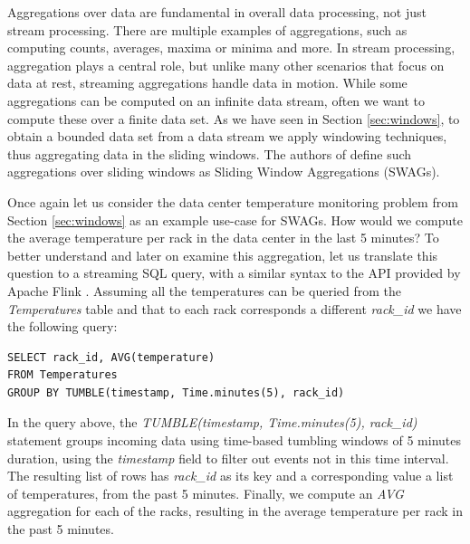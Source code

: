 Aggregations over data are fundamental in overall data processing, not just stream processing. There are multiple examples of aggregations, such as computing counts, averages, maxima or minima and more. In stream processing, aggregation plays a central role, but unlike many other scenarios that focus on data at rest, streaming aggregations handle data in motion. While some aggregations can be computed on an infinite data stream, often we want to compute these over a finite data set. As we have seen in Section \ref{sec:windows}, to obtain a bounded data set from a data stream we apply windowing techniques, thus aggregating data in the sliding windows. The authors of \cite{Tangwongsan-Sliding-Window-Aggregation-Algorithms} define such aggregations over sliding windows as Sliding Window Aggregations (SWAGs). 

Once again let us consider the data center temperature monitoring problem from Section \ref{sec:windows} as an example use-case for SWAGs. How would we compute the average temperature per rack in the data center in the last 5 minutes? To better understand and later on examine this aggregation, let us translate this question to a streaming SQL query, with a similar syntax to the API provided by Apache Flink \cite{flink}. Assuming all the temperatures can be queried from the \textit{Temperatures} table and that to each rack corresponds a different \textit{rack\_id} we have the following query:

\begin{verbatim}
SELECT rack_id, AVG(temperature)
FROM Temperatures
GROUP BY TUMBLE(timestamp, Time.minutes(5), rack_id)
\end{verbatim}

In the query above, the \textit{TUMBLE(timestamp, Time.minutes(5), rack\_id)} statement groups incoming data using time-based tumbling windows of 5 minutes duration, using the \textit{timestamp} field to filter out events not in this time interval. The resulting list of rows has \textit{rack\_id} as its key and a corresponding value a list of temperatures, from the past 5 minutes. Finally, we compute an \textit{AVG} aggregation for each of the racks, resulting in the average temperature per rack in the past 5 minutes.

